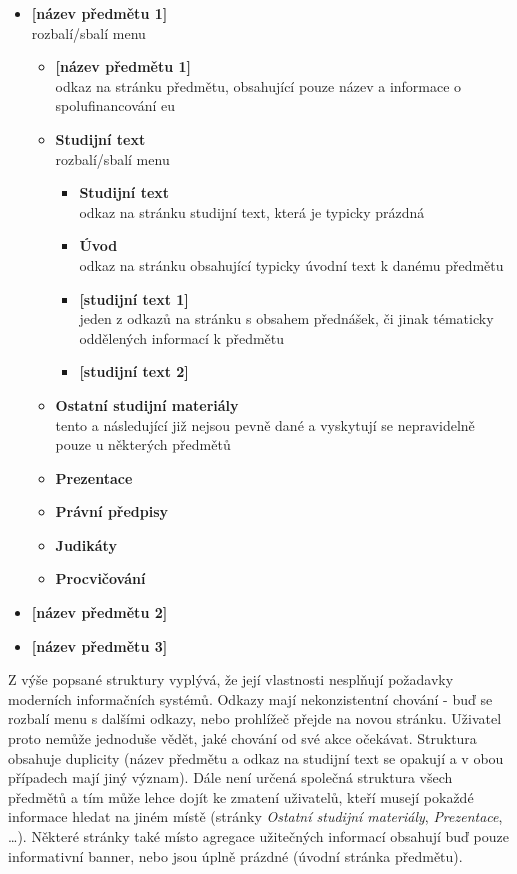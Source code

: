 \begin{itemize}
  \item \textbf{[název předmětu 1]} \hfill \\
    rozbalí/sbalí menu
  \begin{itemize}
    \item \textbf{[název předmětu 1]} \hfill \\
      odkaz na stránku předmětu, obsahující pouze název a informace o spolufinancování \gls{eu}
    \item \textbf{Studijní text} \hfill \\
      rozbalí/sbalí menu
      \begin{itemize}
        \item \textbf{Studijní text} \hfill \\
          odkaz na stránku studijní text, která je typicky prázdná
        \item \textbf{Úvod} \hfill \\
          odkaz na stránku obsahující typicky úvodní text k danému předmětu
        \item \textbf{[studijní text 1]} \hfill \\
          jeden z odkazů na stránku s obsahem přednášek, či jinak tématicky oddělených informací k předmětu
        \item \textbf{[studijní text 2]}
      \end{itemize}
    \item \textbf{Ostatní studijní materiály} \hfill \\
      tento a následující již nejsou pevně dané a vyskytují se nepravidelně pouze u některých předmětů
    \item \textbf{Prezentace}
    \item \textbf{Právní předpisy}            
    \item \textbf{Judikáty}
    \item \textbf{Procvičování}        
  \end{itemize}
  \item \textbf{[název předmětu 2]}
  \item \textbf{[název předmětu 3]}
\end{itemize}

Z výše popsané struktury vyplývá, že její vlastnosti nesplňují požadavky moderních informačních systémů. Odkazy mají nekonzistentní chování - buď se rozbalí menu s dalšími odkazy, nebo prohlížeč přejde na novou stránku. Uživatel proto nemůže jednoduše vědět, jaké chování od své akce očekávat. Struktura obsahuje duplicity (název předmětu a odkaz na studijní text se opakují a v obou případech mají jiný význam). Dále není určená společná struktura všech předmětů a tím může lehce dojít ke zmatení uživatelů, kteří musejí pokaždé informace hledat na jiném místě (stránky \emph{Ostatní studijní materiály}, \emph{Prezentace}, \dots). Některé stránky také místo agregace užitečných informací obsahují buď pouze informativní banner, nebo jsou úplně prázdné (úvodní stránka předmětu).

